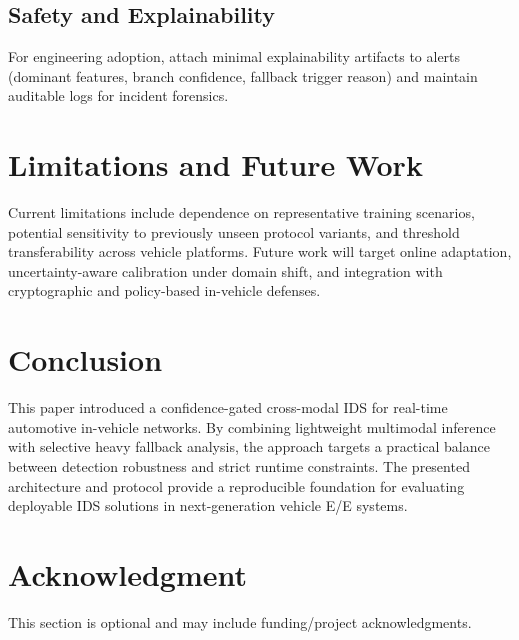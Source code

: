 \documentclass[conference]{IEEEtran}
\begin{document}
\subsection{Safety and Explainability}
For engineering adoption, attach minimal explainability artifacts to alerts (dominant features, branch confidence, fallback trigger reason) and maintain auditable logs for incident forensics.

\section{Limitations and Future Work}
Current limitations include dependence on representative training scenarios, potential sensitivity to previously unseen protocol variants, and threshold transferability across vehicle platforms. Future work will target online adaptation, uncertainty-aware calibration under domain shift, and integration with cryptographic and policy-based in-vehicle defenses.

\section{Conclusion}
This paper introduced a confidence-gated cross-modal IDS for real-time automotive in-vehicle networks. By combining lightweight multimodal inference with selective heavy fallback analysis, the approach targets a practical balance between detection robustness and strict runtime constraints. The presented architecture and protocol provide a reproducible foundation for evaluating deployable IDS solutions in next-generation vehicle E/E systems.

\section*{Acknowledgment}
This section is optional and may include funding/project acknowledgments.
\end{document}

